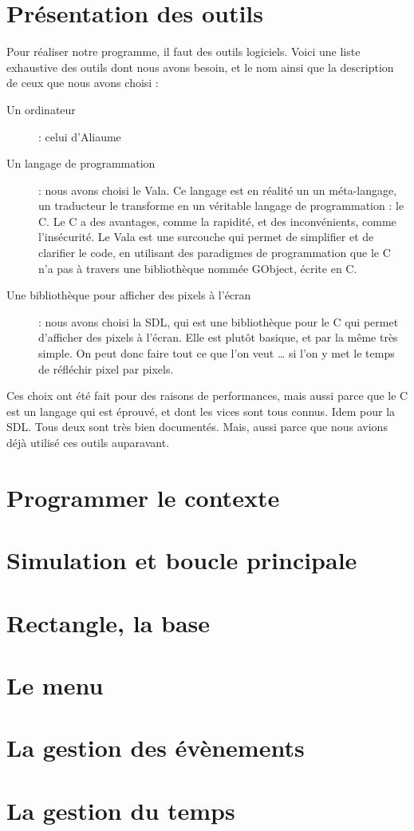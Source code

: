 \section{Présentation des outils}
  Pour réaliser notre programme, il faut des outils logiciels.
  Voici une liste exhaustive des outils dont nous avons besoin, et le 
  nom ainsi que la description de ceux que nous avons choisi : 
    \begin{description}
      \item[Un ordinateur] : celui d'Aliaume 
      \item[Un langage de programmation] : nous avons choisi le Vala. Ce langage est en réalité un
        un méta-langage, un traducteur le transforme en un véritable langage de programmation : le C.
        Le C a des avantages, comme la rapidité, et des inconvénients, comme l'insécurité. Le Vala est une 
        surcouche qui permet de simplifier et de clarifier le code, en utilisant des paradigmes de programmation
        que le C n'a pas à travers une bibliothèque nommée GObject, écrite en C.
      \item[Une bibliothèque pour afficher des pixels à l'écran] : nous avons choisi la SDL, qui est une bibliothèque pour le C qui permet d'afficher des pixels à l'écran. Elle est plutôt basique, et par la même très simple. On peut donc faire tout ce que l'on veut … si l'on y met le temps de réfléchir pixel par pixels.
    \end{description}
  
  Ces choix ont été fait pour des raisons de performances, mais aussi parce que le C est un langage qui est éprouvé, et dont les vices sont tous connus. Idem pour la SDL. Tous deux sont très bien documentés. Mais, aussi parce que nous avions déjà utilisé ces outils auparavant.

\section{Programmer le contexte}
  

\section{Simulation et boucle principale}
  
\section{Rectangle, la base}
  
  
\section{Le menu}
  
    
\section{La gestion des évènements}
  
\section{La gestion du temps}
  
    
    
    
     
